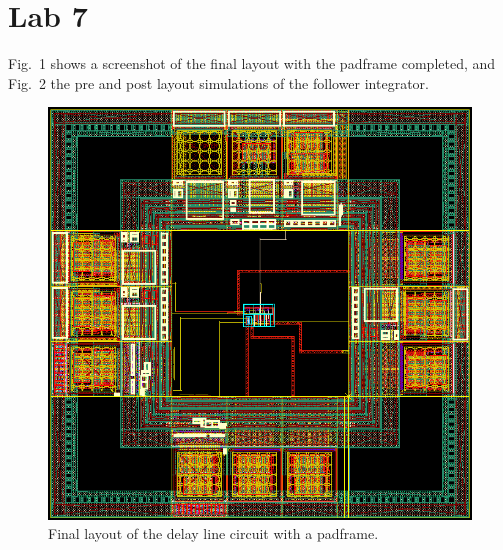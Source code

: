 

\newcommand{\reffig}[1]{Fig.~\ref{#1}}



\newpage
\section{Lab 7}
Fig.~1 shows a screenshot of the final layout with the padframe completed, and Fig.~2 the pre and post layout simulations of the
follower integrator.
\begin{figure}
    \center
    \includegraphics[width=\textwidth]{chip.png}
    \caption{Final layout of the delay line circuit with a padframe.}
    \label{}
\end{figure}
